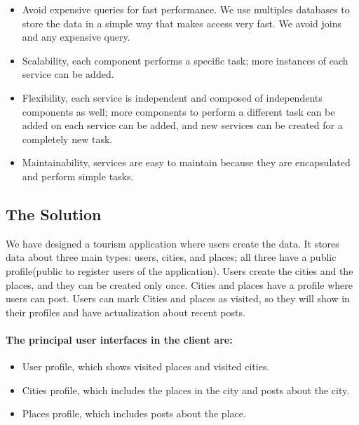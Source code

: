 \begin{itemize}
	\item Avoid expensive queries for fast performance. We use multiples databases to store the data in a simple way that makes access very fast. We avoid joins and any expensive query.
	
	\item	Scalability, each component performs a specific task; more instances of each service can be added.
	
	\item	Flexibility, each service is independent and composed of independents components as well; more components to perform a different task can be added on each service can be added, and new services can be created for a completely new task.
	
	\item Maintainability, services are easy to maintain because they are encapsulated and perform simple tasks.
	
\end{itemize}



\subsection{The Solution}
\indent
\indent
We have designed a tourism application where users create the data.  It stores data about three main types: users, cities, and places; all three have a public profile(public to register users of the application). Users create the cities and the places, and they can be created only once. Cities and places have a profile where users can post. Users can mark Cities and places as visited, so they will show in their profiles and have actualization about recent posts.

\paragraph{The principal user interfaces in the client are:}

\begin{itemize}
	\item User profile, which shows visited places and visited cities.
		\item Cities profile, which includes the places in the city and posts about the city.
	\item	Places profile, which includes posts about the place.
\end{itemize}


